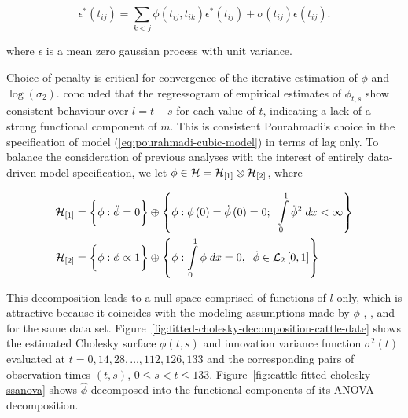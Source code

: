 \begin{equation} \label{eq:cattleA-dynamic-cond-mixed-model-1}
\epsilon^*\left(t_{ij}\right) = \sum_{k < j} \phi\left( t_{ij}, t_{ik} \right) \epsilon^*\left(t_{ij}\right) + \sigma\left(t_{ij}\right)\epsilon\left(t_{ij}\right).
\end{equation}

\noindent
where $\epsilon$ is a mean zero gaussian process with unit variance.

\bigskip

Choice of penalty is critical for convergence of the iterative estimation of $\phi$ and $\log\left(\sigma_2 \right)$. \cite{pan2017jmcm} concluded that the regressogram of empirical estimates of $\phi_{t,s}$ show consistent behaviour over $l = t - s$ for each value of $t$, indicating a lack of a strong functional component of $m$. This is consistent Pourahmadi's choice in the specification of model (\ref{eq:pourahmadi-cubic-model}) in terms of lag only. To balance the consideration of previous analyses with the interest of entirely data-driven model specification, we let $\phi \in \mathcal{H} = \mathcal{H}_{\left[1\right]} \otimes \mathcal{H}_{\left[2\right]}$, where 

\begin{align*} 
\mathcal{H}_{\left[1\right]} &= \bigg\{ \phi: \ddot{\phi} = 0 \bigg\} \oplus \left\{\phi: \phi\left(0\right) = \dot{\phi}\left(0\right) = 0; \;\; \int\limits_0^1 \ddot{\phi}^2 \;dx < \infty \right\} \\
\mathcal{H}_{\left[2\right]} &= \bigg\{ \phi: \phi \propto 1 \bigg\} \oplus \left\{ \phi: \int\limits_0^1 \phi \;dx = 0, \;\; \dot{\phi} \in \mathcal{L}_2\left[0,1\right]  \right\} 
\end{align*} 

This decomposition leads to a null space comprised of functions of $l$ only, which is attractive because it coincides with the modeling assumptions made by $\phi$ \cite{pan2017jmcm}, \cite{huang2006covariance}, and \cite{wu2003nonparametric} for the same data set.  Figure~\ref{fig:fitted-cholesky-decomposition-cattle-date} shows the estimated Cholesky surface $\phi\left( t,s\right)$ and innovation variance function $\sigma^2\left(t\right)$ evaluated at $t =  0,14, 28,\dots,112, 126,133$ and the corresponding pairs of observation times $\left(t,s\right)$, $0 \le s < t \le 133$. Figure~\ref{fig:cattle-fitted-cholesky-ssanova} shows $\hat{\phi}$ decomposed into the functional components of its ANOVA decomposition.




